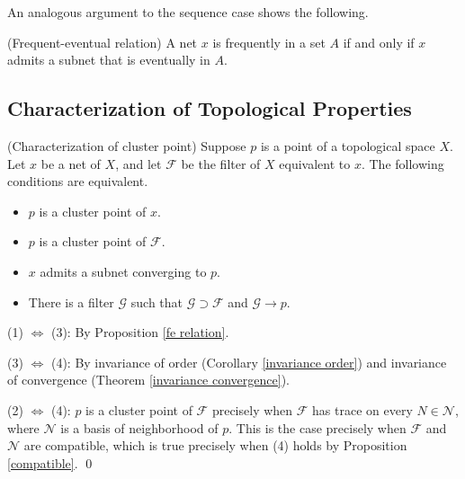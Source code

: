 \documentclass{report}
\begin{document}
An analogous argument to the sequence case shows the following.
\begin{exe}\label{fe relation} (Frequent-eventual relation)
    A net \( x \) is frequently in a set \( A \) if and only if \( x \) admits a subnet that is eventually in \( A \).
\end{exe}

\subsection{Characterization of Topological Properties} \label{characterization of topological properties}

\begin{prp}\label{characterize cluster point} (Characterization of cluster point)
    Suppose \( p \) is a point of a topological space \( X \). Let \( x \) be a net of \( X \), and let \( \mathscr{F} \) be the filter of \( X \) equivalent to \( x \). The following conditions are equivalent.
    \begin{itemize}
        \item[(1)] \( p \) is a cluster point of \( x \).
        \item[(2)] \( p \) is a cluster point of \( \mathscr{F} \).
        \item[(3)] \( x \) admits a subnet converging to \( p \).
        \item[(4)] There is a filter \( \mathscr{G} \) such that \( \mathscr{G} \supset \mathscr{F} \) and \( \mathscr{G} \to p \).
    \end{itemize}
\end{prp}
\begin{prf}
    (1) \( \iff \) (3): By Proposition \ref{fe relation}.

    (3) \( \iff \) (4): By invariance of order (Corollary \ref{invariance order})  and invariance of convergence (Theorem \ref{invariance convergence}).

    (2) \( \iff \) (4): \( p \) is a cluster point of \( \mathscr{F} \) precisely when \( \mathscr{F} \) has trace on every \( N \in \mathscr{N} \), where \( \mathscr{N} \) is a basis of neighborhood of \( p \). This is the case precisely when \( \mathscr{F} \) and \( \mathscr{N} \) are compatible, which is true precisely when (4) holds by Proposition \ref{compatible}.
    \qed\end{prf}
\end{document}
